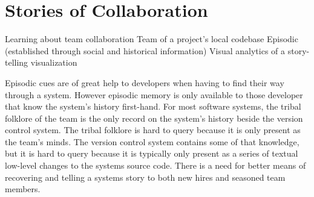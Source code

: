 

%


\chapter{Stories of Collaboration}
\label{the chapter on chronia}

\infobox
	{Learning about team collaboration}
	{Team of a project's local codebase}
	{Episodic (established through social and historical information)}
	{Visual analytics of a story-telling visualization}

Episodic cues are of great help to developers when having to find their way through a system. However episodic memory is only available to those developer that know the system's history first-hand. For most software systems, the tribal folklore of the team is the only record on the system's history beside the version control system. The tribal folklore is hard to query because it is only present as the team's minds. The version control system contains some of that knowledge, but it is hard to query because it is typically only present as a series of textual low-level changes to the systems source code. There is a need for better means of recovering and telling a systems story to both new hires and seasoned team members.

